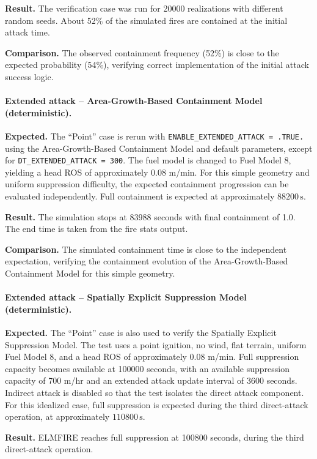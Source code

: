 \textbf{Result.} The verification case was run for 20000 realizations with different random seeds. About 52\% of the simulated fires are contained at the initial attack time.

\textbf{Comparison.} The observed containment frequency (52\%) is close to the expected probability (54\%), verifying correct implementation of the initial attack success logic.


\paragraph{Extended attack -- Area-Growth-Based Containment Model (deterministic).}
\textbf{Expected.} The ``Point'' case is rerun with \texttt{ENABLE\_EXTENDED\_ATTACK = .TRUE.} using the Area-Growth-Based Containment Model and default parameters, except for \texttt{DT\_EXTENDED\_ATTACK = 300}. The fuel model is changed to Fuel Model 8, yielding a head ROS of approximately 0.08 m/min. For this simple geometry and uniform suppression difficulty, the expected containment progression can be evaluated independently. Full containment is expected at approximately $88200\,\mathrm{s}$.

\textbf{Result.} The simulation stops at 83988 seconds with final containment of 1.0. The end time is taken from the fire stats output.

\textbf{Comparison.} The simulated containment time is close to the independent expectation, verifying the containment evolution of the Area-Growth-Based Containment Model for this simple geometry.


\paragraph{Extended attack -- Spatially Explicit Suppression Model (deterministic).}
\textbf{Expected.} The ``Point'' case is also used to verify the Spatially Explicit Suppression Model. The test uses a point ignition, no wind, flat terrain, uniform Fuel Model 8, and a head ROS of approximately 0.08 m/min. Full suppression capacity becomes available at 100000 seconds, with an available suppression capacity of 700 m/hr and an extended attack update interval of 3600 seconds. Indirect attack is disabled so that the test isolates the direct attack component. For this idealized case, full suppression is expected during the third direct-attack operation, at approximately $110800\,\mathrm{s}$.

\textbf{Result.} ELMFIRE reaches full suppression at 100800 seconds, during the third direct-attack operation.

